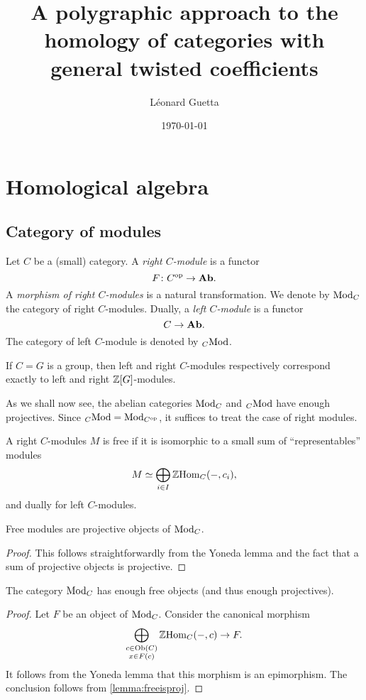 \documentclass{amsart}
\title{A polygraphic approach to the homology of categories with general twisted
coefficients}
\author{Léonard Guetta}
\date{\today}
\renewcommand{\homset}[3]{\mathrm{Hom}_{#1}(#2,#3)}
\begin{document}
\maketitle
\section{Homological algebra}
\subsection{Category of modules}
\begin{definition}
  Let $C$ be a (small) category. A \emph{right $C$\nbd-module} is a
  functor
  \[
    F \colon C^{{\mathrm{op}}} \to \mathbf{Ab}.
  \]
  A \emph{morphism of right $C$\nbd-modules} is a natural
  transformation. We denote by $\mathrm{Mod}_{C}$ the category of right
  $C$\nbd-modules. Dually, a \emph{left $C$\nbd-module} is a functor
  \[
    C \to \mathbf{Ab}.
  \]
  The category of left $C$\nbd-module is denoted by ${}_{C}\mathrm{Mod}$.
\end{definition}
\begin{example}
  If $C=G$ is a group, then left and right $C$\nbd-modules
  respectively correspond
  exactly to left and right $\mathbb Z[G]$\nbd-modules. 
\end{example}

As we shall now see, the abelian categories $\mathrm{Mod}_{C}$ and ${}_{C}\mathrm{Mod}$
have enough projectives. Since ${}_{C}\mathrm{Mod}=\mathrm{Mod}_{C^{{\mathrm{op}}}}$, it suffices
to treat the case of right modules.

\begin{definition}
  A right $C$\nbd-modules $M$ is free if it is isomorphic to a small
  sum
  of ``representables'' modules
  \[
  M \simeq \bigoplus_{i \in I}\Z\homset{C}{-}{c_i},
\]
and dually for left $C$\nbd-modules.
\end{definition}
\begin{lemma}\label{lemma:freeisproj}
  Free modules are projective objects of $\mathrm{Mod}_{C}$.
\end{lemma}
\begin{proof}
  This follows straightforwardly from the Yoneda lemma and the fact
  that a sum of projective objects is projective.
\end{proof}
\begin{proposition}\label{prop:enoughproj}
  The category $\mathrm{Mod}_{C}$ has enough free objects (and thus enough projectives).
\end{proposition}
\begin{proof}
  Let $F$ be an object of $\mathrm{Mod}_{C}$. Consider the canonical
  morphism
  \[
    \bigoplus_{\substack{c \in \Ob(C)\\ x \in F(c)}} \Z\homset{C}{-}{c} \to F.
  \]
 It follows from the Yoneda lemma that this morphism is
  an epimorphism. The conclusion follows from \cref{lemma:freeisproj}.
\end{proof}
\end{document}
